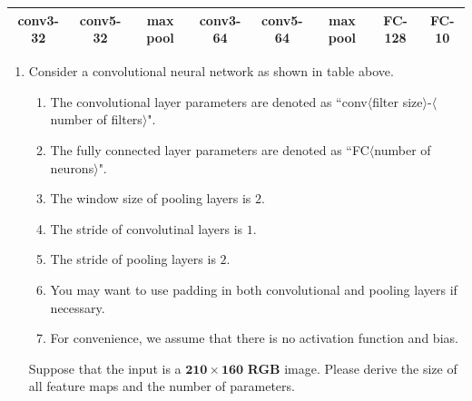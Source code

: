 \documentclass[11pt,letter,notitlepage]{article}
\begin{document}
\newpage
\begin{exercise}

\centering
\begin{tabular}{|c|c|c|c|c|c|c|c|}
    \hline
    conv3-32 & conv5-32 & max pool & conv3-64 & conv5-64 & max pool & FC-128 & FC-10\\
    \hline
\end{tabular}

\begin{enumerate}
    \item Consider a convolutional neural network as shown in table above.
    \begin{enumerate}
        \item The convolutional layer parameters are denoted as ``conv$\langle$filter size$\rangle$-$\langle$number of filters$\rangle$".
        \item  The fully connected layer parameters are denoted as ``FC$\langle$number of neurons$\rangle$".
        \item The window size of pooling layers is $2$.
        \item The stride of convolutinal layers is $1$.
        \item The stride of pooling layers is $2$.
        \item You may want to use padding in both convolutional and pooling layers if necessary.
        \item For convenience, we assume that there is no activation function and bias.
    \end{enumerate}
    
    Suppose that the input is a $\mathbf{210\times 160}$ \textbf{RGB} image. Please derive the size of all feature maps and the number of parameters.
    

\end{enumerate}
\end{exercise}
\end{document}
